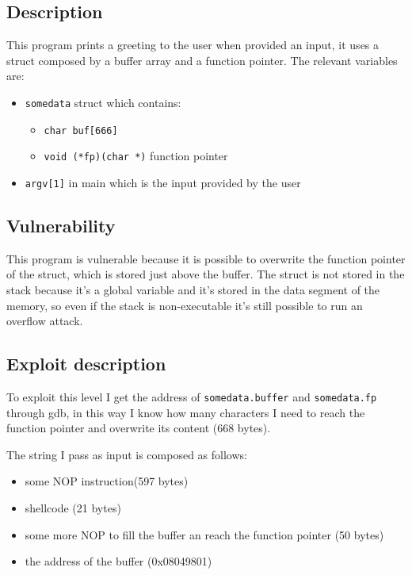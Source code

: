 \documentclass[a4paper,12pt]{article}
\begin{document}
\subsection{Description}

This program prints a greeting to the user when provided an input, it uses a struct composed by a buffer array and a function pointer. The relevant variables are:
\begin{itemize}

\item \texttt{somedata} struct which contains:
		\begin{itemize}
		\item \texttt{char buf[666]}
		\item \texttt{void (*fp)(char *)} function pointer
		\end{itemize}
\item \texttt{argv[1]} in main which is the input provided by the user
\end{itemize}

\subsection{Vulnerability}

This program is vulnerable because it is possible to overwrite the function pointer of the struct, which is stored just above the buffer. The struct is not stored in the stack because it's a global variable and it's stored in the data segment of the memory, so even if the stack is non-executable it's still possible to run an overflow attack.


\subsection{Exploit description}

To exploit this level I get the address of \texttt{somedata.buffer} and \texttt{somedata.fp} through gdb, in this way I know how many characters I need to reach the function pointer and overwrite its content (668 bytes).

The string I pass as input is composed as follows:

\begin{itemize}
\item some NOP instruction(597 bytes)
\item shellcode (21 bytes)
\item some more NOP to fill the buffer an reach the function pointer (50 bytes)
\item the address of the buffer (0x08049801)
\end{itemize}
\end{document}
